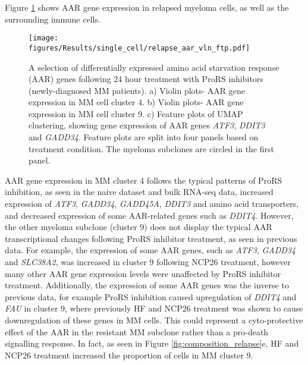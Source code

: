 Figure \ref{fig:relapse_aar_vln_ftp} shows AAR gene expression in relapsed myeloma cells, as well as the surrounding immune cells.
%
\begin{figure}[htb]
\centering
\texttt{[image: figures/Results/single\_cell/relapse\_aar\_vln\_ftp.pdf]}
\caption[scRNA-seq differentially expressed AAR genes- relapsed MM]{A selection of differentially expressed amino acid starvation response (AAR) genes following 24 hour treatment with ProRS inhibitors (newly-diagnosed MM patients).
    a) Violin plots- AAR gene expression in MM cell cluster 4.
    b) Violin plots- AAR gene expression in MM cell cluster 9.
    c) Feature plots of UMAP clustering, showing gene expression of AAR genes \textit{ATF3}, \textit{DDIT3} and \textit{GADD34}.
Feature plots are split into four panels based on treatment condition.
The myeloma subclones are circled in the first panel.
}
\label{fig:relapse_aar_vln_ftp}
\end{figure}
AAR gene expression in MM cluster 4 follows the typical patterns of ProRS inhibition, as seen in the naive dataset and bulk RNA-seq data, increased expression of \textit{ATF3}, \textit{GADD34}, \textit{GADD45A}, \textit{DDIT3} and amino acid transporters, and decreased expression of some AAR-related genes such as \textit{DDIT4}.
However, the other myeloma subclone (cluster 9) does not display the typical AAR transcriptional changes following ProRS inhibitor treatment, as seen in previous data.
For example, the expression of some AAR genes, such as \textit{ATF3}, \textit{GADD34} and \textit{SLC38A2}, was increased in cluster 9 following NCP26 treatment, however many other AAR gene expression levels were unaffected by ProRS inhibitor treatment.
Additionally, the expression of some AAR genes was the inverse to previous data, for example ProRS inhibition caused upregulation of \textit{DDIT4} and \textit{FAU} in cluster 9, where previously HF and NCP26 treatment was shown to cause downregulation of these genes in MM cells.
This could represent a cyto-protective effect of the AAR in the resistant MM subclone rather than a pro-death signalling response.
In fact, as seen in Figure \ref{fig:composition_relapse}e, HF and NCP26 treatment increased the proportion of cells in MM cluster 9.

